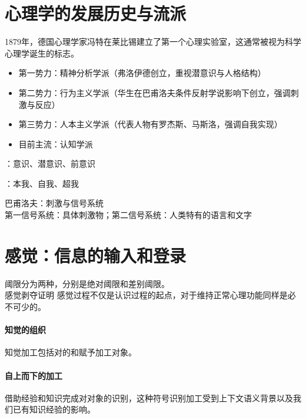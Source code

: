\documentclass[b5paper,11pt]{article}
\begin{document}
\section{心理学的发展历史与流派}
 1879年，德国心理学家冯特在莱比锡建立了第一个心理实验室，这通常被视为科学心理学诞生的标志。

\begin{itemize}
  \item [-] 第一势力：精神分析学派（弗洛伊德创立，重视潜意识与人格结构）
  \item [-] 第二势力：行为主义学派（华生在巴甫洛夫条件反射学说影响下创立，强调刺激与反应）
  \item [-] 第三势力：人本主义学派（代表人物有罗杰斯、马斯洛，强调自我实现）
  \item [-] 目前主流：认知学派
\end{itemize}

\vspace{1.2em}

：意识、潜意识、前意识

\vspace{0.2em}
：本我、自我、超我

\vspace{0.5em}

\noindent
巴甫洛夫：刺激与信号系统 \\
第一信号系统：具体刺激物；第二信号系统：人类特有的语言和文字

\section{感觉：信息的输入和登录}

\noindent
\textcolor{ctp-green}{阈限分为两种}，分别是绝对阈限和差别阈限。 \\
\textcolor{ctp-green}{感觉剥夺证明} 感觉过程不仅是认识过程的起点，对于维持正常心理功能同样是必不可少的。

\paragraph{知觉的组织}
知觉加工包括对的和赋予加工对象。

\paragraph{自上而下的加工} 借助经验和知识完成对对象的识别，这种符号识别加工受到上下文语义背景以及我们已有知识经验的影响。
\end{document}

